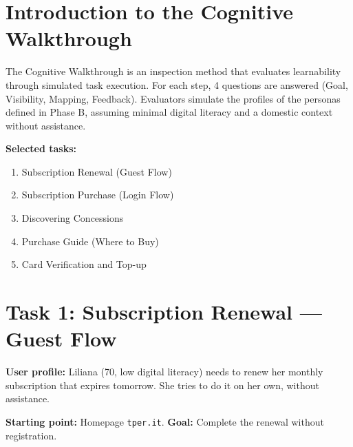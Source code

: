 \vspace{0.3cm}

\section{Introduction to the Cognitive Walkthrough}

\begin{tcolorbox}[colback=backgroundColor,colframe=borderColor,arc=2mm]
\small
The Cognitive Walkthrough is an inspection method that evaluates learnability through simulated task execution. For each step, 4 questions are answered (Goal, Visibility, Mapping, Feedback). Evaluators simulate the profiles of the personas defined in Phase B, assuming minimal digital literacy and a domestic context without assistance.

\vspace{0.2cm}
\noindent\textbf{Selected tasks:}
\begin{enumerate}
 \item Subscription Renewal (Guest Flow)
 \item Subscription Purchase (Login Flow)
 \item Discovering Concessions
 \item Purchase Guide (Where to Buy)
 \item Card Verification and Top-up
\end{enumerate}
\end{tcolorbox}

\vspace{0.5cm}

\section{Task 1: Subscription Renewal --- Guest Flow}

\begin{tcolorbox}[colback=primaryColor!10,colframe=primaryColor,arc=2mm]
\small
\textbf{User profile:} Liliana (70, low digital literacy) needs to renew her monthly subscription that expires tomorrow. She tries to do it on her own, without assistance.

\textbf{Starting point:} Homepage \texttt{tper.it}. \textbf{Goal:} Complete the renewal without registration.
\end{tcolorbox}


